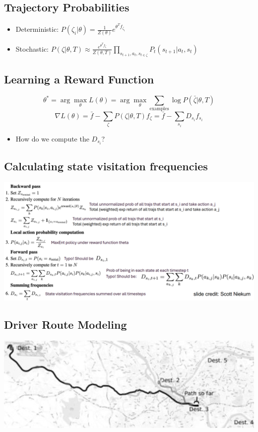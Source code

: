 \documentclass[10pt]{article}
\begin{document}
\subsection*{Trajectory Probabilities}
\begin{itemize}
	\item Deterministic: $P(\zeta_i | \theta) = \frac{1}{Z(\theta)} e^{\theta^T f_{\zeta_i}}$
	\item Stochastic: $P(\zeta|\theta, T) \approx \frac{e^{\theta^T f_\zeta}}{Z(\theta, T)} \prod_{s_{t + 1}, a_t, s_{t \in \zeta}} P_t (s_{t + 1} | a_t, s_t)$
\end{itemize}

\subsection*{Learning a Reward Function}
\[\theta^* = \arg\max_{\theta} L(\theta) = \arg\max_{\theta} \sum_{\text{examples}} \log P(\bar{\zeta} | \theta, T)\]
\[\nabla L(\theta) = \bar{f} - \sum_{\zeta} P(\zeta | \theta, T) f_\zeta = \bar{f} - \sum_{s_i} D_{s_i} f_{s_i}\]
\begin{itemize}
	\item How do we compute the $D_{s_i}$?
\end{itemize}

\subsection*{Calculating state visitation frequencies}
\begin{center}
    \includegraphics*[width=\textwidth]{L2_27.png}
\end{center}


\subsection*{Driver Route Modeling}
\begin{center}
    \includegraphics*[width=\textwidth]{L2_28.png}
\end{center}
\end{document}
